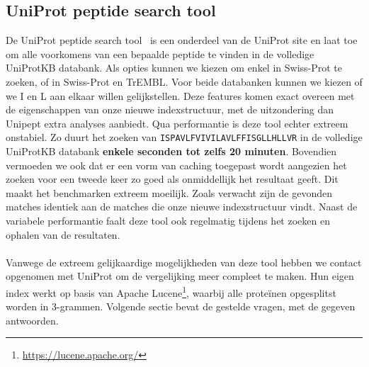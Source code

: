 \subsection{UniProt peptide search tool}
De UniProt peptide search tool~\cite{uniprot_search_paper, uniprot_search_site} is een onderdeel van de UniProt site en laat toe om alle voorkomens van een bepaalde peptide te vinden in de volledige UniProtKB databank.
Als opties kunnen we kiezen om enkel in Swiss-Prot te zoeken, of in Swiss-Prot en TrEMBL\@.
Voor beide databanken kunnen we kiezen of we I en L aan elkaar willen gelijkstellen.
Deze features komen exact overeen met de eigenschappen van onze nieuwe indexstructuur, met de uitzondering dan Unipept extra analyses aanbiedt.
Qua performantie is deze tool echter extreem onstabiel.
Zo duurt het zoeken van \texttt{ISPAVLFVIVILAVLFFISGLLHLLVR} in de volledige UniProtKB databank \textbf{enkele seconden tot zelfs 20 minuten}.
Bovendien vermoeden we ook dat er een vorm van caching toegepast wordt aangezien het zoeken voor een tweede keer zo goed als onmiddellijk het resultaat geeft.
Dit maakt het benchmarken extreem moeilijk.
Zoals verwacht zijn de gevonden matches identiek aan de matches die onze nieuwe indexstructuur vindt.
Naast de variabele performantie faalt deze tool ook regelmatig tijdens het zoeken en ophalen van de resultaten.
\\ \\
Vanwege de extreem gelijkaardige mogelijkheden van deze tool hebben we contact opgenomen met UniProt om de vergelijking meer compleet te maken.
Hun eigen index werkt op basis van Apache Lucene\footnote{\url{https://lucene.apache.org/}}, waarbij alle proteïnen opgesplitst worden in 3-grammen.
Volgende sectie bevat de gestelde vragen, met de gegeven antwoorden.

